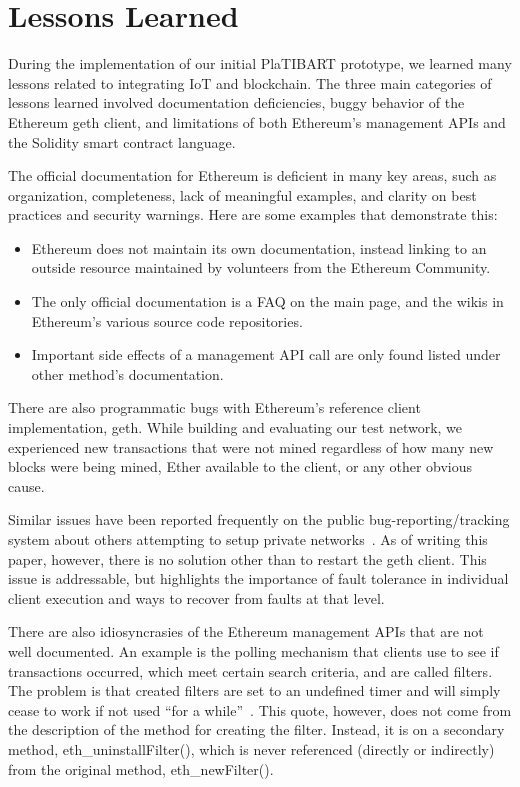 \section{Lessons Learned}
\label{lessonslearned}

During the implementation of our initial PlaTIBART prototype, we learned many lessons related to integrating IoT and blockchain. The three main categories of lessons learned involved documentation deficiencies, buggy behavior of the Ethereum geth client, and limitations of both Ethereum's management APIs and the Solidity smart contract language.

The official documentation for Ethereum is deficient in many key areas, such as organization, completeness, lack of meaningful examples, and clarity on best practices and security warnings. Here are some examples that demonstrate this:

\begin{itemize}
	\item Ethereum does not maintain its own documentation, instead linking to an outside resource maintained by volunteers from the Ethereum Community.
	\item The only official documentation is a FAQ on the main page, and the wikis in Ethereum's various source code repositories. 
	\item Important side effects of a management API call are only found listed under other method's documentation.
\end{itemize}

There are also programmatic bugs with Ethereum's reference client implementation, geth. While building and evaluating our test network, we experienced new transactions that were not mined regardless of how many new blocks were being mined, Ether available to the client, or any other obvious cause. 

Similar issues have been reported frequently on the public bug-reporting/tracking system about others attempting to setup private networks~\cite{EthereumIssue14893:online}. As of writing this paper, however, there is no solution other than to restart the geth client. This issue is addressable, but highlights the importance of fault tolerance in individual client execution and ways to recover from faults at that level. 

There are also idiosyncrasies of the Ethereum management APIs that are not well documented. An example is the polling mechanism that clients use to see if transactions occurred, which meet certain search criteria, and are called filters. The problem is that created filters are set to an undefined timer and will simply cease to work if not used ``for a while''~\cite{EthereumJSONRPC}. This quote, however, does not come from the description of the method for creating the filter. Instead, it is on a secondary method, eth\_uninstallFilter(), which is never referenced (directly or indirectly) from the original method, eth\_newFilter(). 

